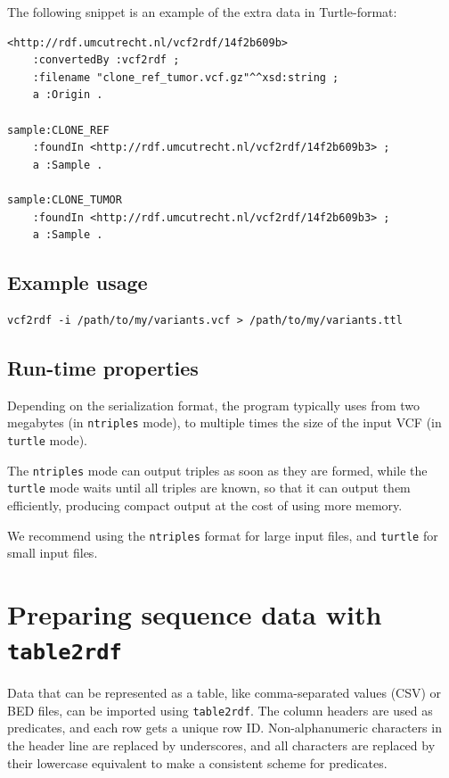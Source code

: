 \documentclass[11pt,a4paper,oneside]{book}
\begin{document}
  The following snippet is an example of the extra data in Turtle-format:

  \begin{siderules}
\begin{verbatim}
<http://rdf.umcutrecht.nl/vcf2rdf/14f2b609b>
    :convertedBy :vcf2rdf ;
    :filename "clone_ref_tumor.vcf.gz"^^xsd:string ;
    a :Origin .

sample:CLONE_REF
    :foundIn <http://rdf.umcutrecht.nl/vcf2rdf/14f2b609b3> ;
    a :Sample .

sample:CLONE_TUMOR
    :foundIn <http://rdf.umcutrecht.nl/vcf2rdf/14f2b609b3> ;
    a :Sample .
\end{verbatim}
\end{siderules}

\subsection{Example usage}

\begin{siderules}
\begin{verbatim}
vcf2rdf -i /path/to/my/variants.vcf > /path/to/my/variants.ttl
\end{verbatim}
\end{siderules}

\subsection{Run-time properties}

  Depending on the serialization format, the program typically uses from two megabytes
  (in \texttt{ntriples} mode), to multiple times the size of the input VCF
  (in \texttt{turtle} mode).

  The \texttt{ntriples} mode can output triples as soon as they are formed, while the
  \texttt{turtle} mode waits until all triples are known, so that it can output them
  efficiently, producing compact output at the cost of using more memory.

  We recommend using the \texttt{ntriples} format for large input files, and
  \texttt{turtle} for small input files.

\section{Preparing sequence data with \texttt{table2rdf}}
\label{sec:table2rdf}

  Data that can be represented as a table, like comma-separated values (CSV)
  or BED files, can be imported using \texttt{table2rdf}.  The column headers
  are used as predicates, and each row gets a unique row ID.  Non-alphanumeric
  characters in the header line are replaced by underscores, and all characters
  are replaced by their lowercase equivalent to make a consistent scheme for
  predicates.
\end{document}
